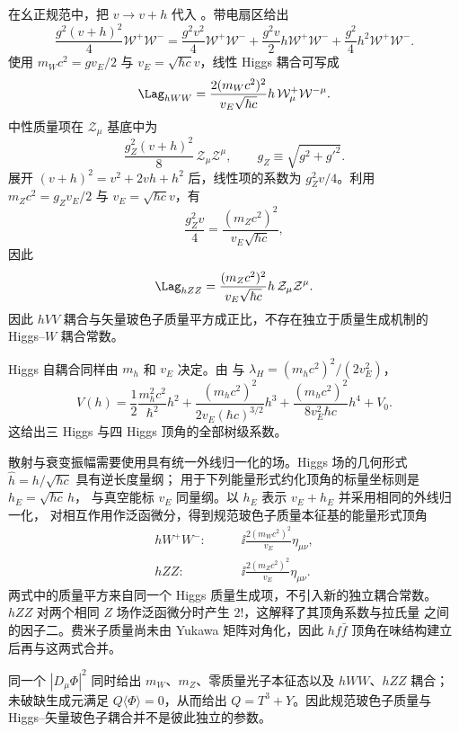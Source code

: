 \begin{proposition}
在幺正规范中，把 $v\to v+h$ 代入 。带电扇区给出
\begin{equation*}
 \frac{g^2(v+h)^2}{4}\mathcal W^+\mathcal W^-
 =\frac{g^2v^2}{4}\mathcal W^+\mathcal W^-
 +\frac{g^2v}{2}h\mathcal W^+\mathcal W^-
 +\frac{g^2}{4}h^2\mathcal W^+\mathcal W^-.
\end{equation*}
使用 $m_Wc^2=gv_E/2$ 与 $v_E=\sqrt{\hbar c}v$，线性 Higgs 耦合可写成
\begin{equation}
 \Lag_{hWW}
 =\frac{2(m_Wc^2)^2}{v_E\sqrt{\hbar c}}
 h\,\mathcal W_\mu^+\mathcal W^{-\mu}.
 \label{eq:hww-coupling-si-dp11}
\end{equation}
中性质量项在 $\mathcal Z_\mu$ 基底中为
\[
 \frac{g_Z^2(v+h)^2}{8}\,
 \mathcal Z_\mu\mathcal Z^\mu,
 \qquad g_Z\equiv\sqrt{g^2+g'^2}.
\]
展开 $(v+h)^2=v^2+2vh+h^2$ 后，线性项的系数为 $g_Z^2v/4$。利用
$ m_Zc^2=g_Zv_E/2$ 与 $v_E=\sqrt{\hbar c}v$，有
\[
 \frac{g_Z^2v}{4}
 =\frac{(m_Zc^2)^2}{v_E\sqrt{\hbar c}},
\]
因此
\begin{equation}
 \Lag_{hZZ}
 =\frac{(m_Zc^2)^2}{v_E\sqrt{\hbar c}}
 h\,\mathcal Z_\mu\mathcal Z^\mu.
 \label{eq:hzz-coupling-si-dp11}
\end{equation}
因此 $hVV$ 耦合与矢量玻色子质量平方成正比，不存在独立于质量生成机制的 Higgs--$W$ 耦合常数。
\end{proposition}

\begin{corollary}
Higgs 自耦合同样由 $m_h$ 和 $v_E$ 决定。由  与 $\lambda_H=(m_hc^2)^2/(2v_E^2)$，
\begin{equation}
 V(h)
 =\frac12\frac{m_h^2c^2}{\hbar^2}h^2
 +\frac{(m_hc^2)^2}{2v_E(\hbar c)^{3/2}}h^3
 +\frac{(m_hc^2)^2}{8v_E^2\hbar c}h^4+V_0.
 \label{eq:higgs-self-couplings-mass-form-dp11}
\end{equation}
这给出三 Higgs 与四 Higgs 顶角的全部树级系数。
\end{corollary}

\begin{proposition}[能量形式顶角及相同场的阶乘]
散射与衰变振幅需要使用具有统一外线归一化的场。Higgs 场的几何形式 $\widehat h=h/\sqrt{\hbar c}$ 具有逆长度量纲；
用于下列能量形式约化顶角的标量坐标则是 $h_E=\sqrt{\hbar c}\,h$，
与真空能标 $v_E$ 同量纲。以 $h_E$ 表示 $v_E+h_E$ 并采用相同的外线归一化，
对相互作用作泛函微分，得到规范玻色子质量本征基的能量形式顶角
\begin{align}
 hW^+W^-:&\qquad \ii\frac{2(m_Wc^2)^2}{v_E}\eta_{\mu\nu},\\
 hZZ:&\qquad \ii\frac{2(m_Zc^2)^2}{v_E}\eta_{\mu\nu}.
 \label{eq:sm-higgs-vector-rules-dp43}
\end{align}
两式中的质量平方来自同一个 Higgs 质量生成项，不引入新的独立耦合常数。$hZZ$ 对两个相同 $Z$ 场作泛函微分时产生 $2!$，这解释了其顶角系数与拉氏量 之间的因子二。费米子质量尚未由 Yukawa 矩阵对角化，因此 $hf\bar f$ 顶角在味结构建立后再与这两式合并。
\end{proposition}

同一个 $|D_\mu\Phi|^2$ 同时给出 $m_W$、$m_Z$、零质量光子本征态以及 $hWW$、$hZZ$ 耦合；未破缺生成元满足 $Q\langle\Phi\rangle=0$，从而给出 $Q=T^3+Y$。因此规范玻色子质量与 Higgs--矢量玻色子耦合并不是彼此独立的参数。


